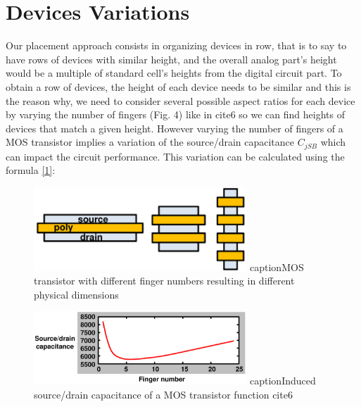\section{Devices Variations}
Our placement approach consists in organizing devices in row, that is to say to have rows of devices with similar height, and the overall analog part's height would be a multiple of standard cell's heights from the digital circuit part. To obtain a row of devices, the height of each device needs to be similar and this is the reason why, we need to consider several possible aspect ratios for each device by varying the number of fingers (Fig. 4) like in cite{6} so we can find heights of devices that match a given height. 
\newline 
\newline 
\indent However varying the number of fingers of a MOS transistor implies a variation of the source/drain capacitance $C_{jSB}$ which can impact the circuit performance. This variation can be calculated using the formula \eqref{1}:

\begin{figure}
  \begin{minipage}[c]{.48\linewidth}
    \begin{center}
      \includegraphics[width=80mm]{Figures/5.png}
      caption{MOS transistor with different finger numbers resulting in different physical dimensions}
    \end{center}
  \end{minipage} \hfill
  \begin{minipage}[c]{.48\linewidth}
    \begin{center}
      \includegraphics[width=80mm]{Figures/4.png}
      caption{Induced source/drain capacitance of a MOS transistor function cite{6}}
    \end{center}
  \end{minipage}
\end{figure}

